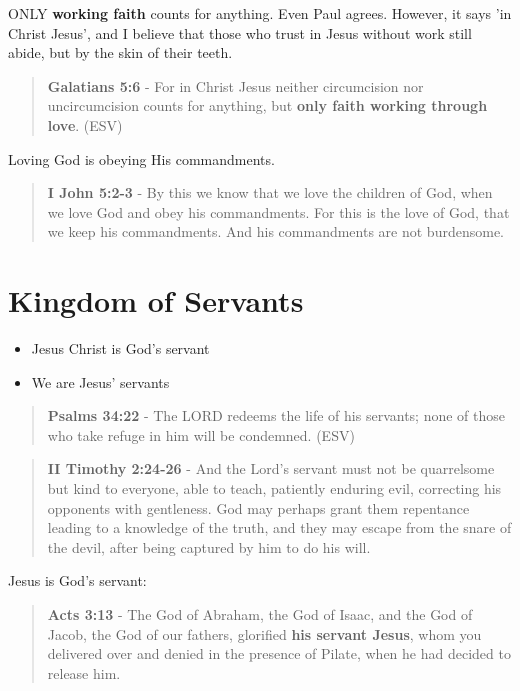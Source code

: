 \documentclass[11pt]{article}
\begin{document}
ONLY \textbf{working faith} counts for anything. Even Paul agrees. However, it says 'in Christ Jesus', and I believe that those who trust in Jesus without work still abide, but by the skin of their teeth.

\begin{quote}
\textbf{Galatians 5:6} - For in Christ Jesus neither circumcision nor uncircumcision counts for anything, but \textbf{only faith working through love}. (ESV)
\end{quote}

Loving God is obeying His commandments.

\begin{quote}
\textbf{I John 5:2-3} - By this we know that we love the children of God, when we love God and obey his commandments. For this is the love of God, that we keep his commandments. And his commandments are not burdensome.
\end{quote}

\section{Kingdom of Servants}
\label{sec:orgdf120e6}
\begin{itemize}
\item Jesus Christ is God's servant
\item We are Jesus' servants
\end{itemize}

\begin{quote}
\textbf{Psalms 34:22} - The LORD redeems the life of his servants; none of those who take refuge in him will be condemned. (ESV)
\end{quote}

\begin{quote}
\textbf{II Timothy 2:24-26} - And the Lord's servant must not be quarrelsome but kind to everyone, able to teach, patiently enduring evil, correcting his opponents with gentleness. God may perhaps grant them repentance leading to a knowledge of the truth, and they may escape from the snare of the devil, after being captured by him to do his will.
\end{quote}

Jesus is God's servant:

\begin{quote}
\textbf{Acts 3:13} - The God of Abraham, the God of Isaac, and the God of Jacob, the God of our fathers, glorified \textbf{his servant Jesus}, whom you delivered over and denied in the presence of Pilate, when he had decided to release him.
\end{quote}
\end{document}
